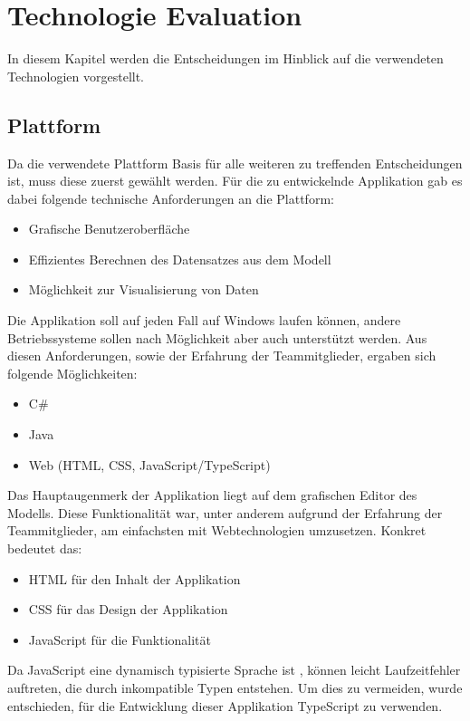
\chapter{Technologie Evaluation}

In diesem Kapitel werden die Entscheidungen im Hinblick auf die verwendeten Technologien vorgestellt.

\section{Plattform}

Da die verwendete Plattform Basis für alle weiteren zu treffenden Entscheidungen ist, muss diese zuerst gewählt werden. Für die zu entwickelnde Applikation gab es dabei folgende technische Anforderungen an die Plattform:

\begin{itemize}
    \item Grafische Benutzeroberfläche
    \item Effizientes Berechnen des Datensatzes aus dem Modell
    \item Möglichkeit zur Visualisierung von Daten
\end{itemize}

Die Applikation soll auf jeden Fall auf Windows laufen können, andere Betriebssysteme sollen nach Möglichkeit aber auch unterstützt werden. Aus diesen Anforderungen, sowie der Erfahrung der Teammitglieder, ergaben sich folgende Möglichkeiten:
\begin{itemize}
    \item C\#
    \item Java
    \item Web (HTML, CSS, JavaScript/TypeScript)
\end{itemize}

Das Hauptaugenmerk der Applikation liegt auf dem grafischen Editor des Modells. Diese Funktionalität war, unter anderem aufgrund der Erfahrung der Teammitglieder, am einfachsten mit Webtechnologien umzusetzen. Konkret bedeutet das:
\begin{itemize}
    \item HTML für den Inhalt der Applikation
    \item CSS für das Design der Applikation
    \item JavaScript für die Funktionalität
\end{itemize}

Da JavaScript eine dynamisch typisierte Sprache ist \cite{mdn:javascript}, können leicht Laufzeitfehler auftreten, die durch inkompatible Typen entstehen. Um dies zu vermeiden, wurde entschieden, für die Entwicklung dieser Applikation TypeScript zu verwenden.

